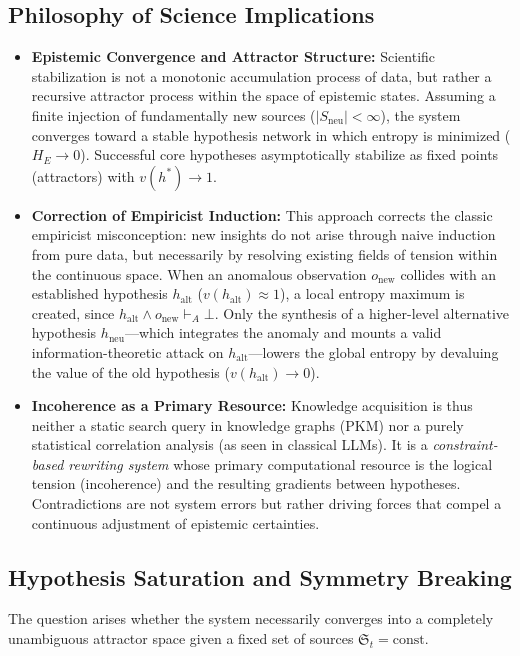 \documentclass[11pt, a4paper]{article}
\begin{document}
	\subsection{Philosophy of Science Implications}
	\begin{itemize}
		\item \textbf{Epistemic Convergence and Attractor Structure:}
		Scientific stabilization is not a monotonic accumulation process of data, but rather a recursive attractor process within the space of epistemic states. Assuming a finite injection of fundamentally new sources ($|S_{\text{neu}}| < \infty$), the system converges toward a stable hypothesis network in which entropy is minimized ($H_E \to 0$). Successful core hypotheses asymptotically stabilize as fixed points (attractors) with $v(h^*) \to 1$.
		
		\item \textbf{Correction of Empiricist Induction:}
		This approach corrects the classic empiricist misconception: new insights do not arise through naive induction from pure data, but necessarily by resolving existing fields of tension within the continuous space. When an anomalous observation $o_{\text{new}}$ collides with an established hypothesis $h_{\text{alt}}$ ($v(h_{\text{alt}}) \approx 1$), a local entropy maximum is created, since $h_{\text{alt}} \land o_{\text{new}} \vdash_A \bot$. Only the synthesis of a higher-level alternative hypothesis $h_{\text{neu}}$—which integrates the anomaly and mounts a valid information-theoretic attack on $h_{\text{alt}}$—lowers the global entropy by devaluing the value of the old hypothesis ($v(h_{\text{alt}}) \to 0$).
		
		\item \textbf{Incoherence as a Primary Resource:}
		Knowledge acquisition is thus neither a static search query in knowledge graphs (PKM) nor a purely statistical correlation analysis (as seen in classical LLMs). It is a \emph{constraint-based rewriting system} whose primary computational resource is the logical tension (incoherence) and the resulting gradients between hypotheses. Contradictions are not system errors but rather driving forces that compel a continuous adjustment of epistemic certainties.
	\end{itemize}
	
	\subsection{Hypothesis Saturation and Symmetry Breaking}
	The question arises whether the system necessarily converges into a completely unambiguous attractor space given a fixed set of sources $\mathfrak{S}_t = \text{const} $.
	
\end{document}
